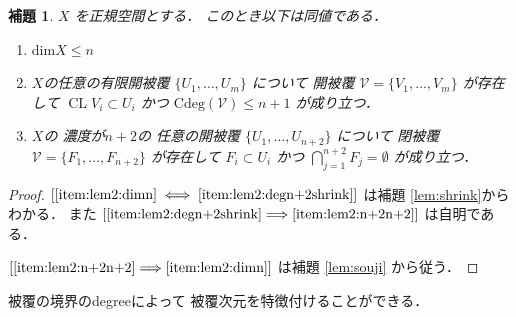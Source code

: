 \documentclass[leqno, a4paper, 12pt]{jsarticle}
\newtheorem{lem}[thm]{補題}
\newcommand{\To}{\Longrightarrow}
\DeclareMathOperator{\cl}{CL}
\newcommand{\yodim}{\mathrm{dim}}
\newcommand{\yodeg}{\mathrm{Cdeg}}
\numberwithin{equation}{section}
\begin{document}
\begin{lem}\label{lem:hihukudim2}
$X$
を正規空間とする．
このとき以下は同値である．
\begin{enumerate}[label=\textup{(\arabic*)}]
\item\label{item:lem2:dimn} 
$\yodim X\le n$
\item\label{item:lem2:degn+2shrink} 

$X$の任意の有限開被覆
$\{U_{1}, \dots, U_{m}\}$
について
開被覆
$\mathcal{V}=\{V_{1}, \dots, V_{m}\}$
が存在して
$\cl V_{i}\subset U_{i}$
かつ
$\yodeg(\mathcal{V})\le n+1$
が成り立つ．


\item\label{item:lem2:n+2n+2} 
$X$の
濃度が$n+2$の
任意の開被覆
$\{U_{1}, \dots, U_{n+2}\}$
について
閉被覆
$\mathcal{V}=\{F_{1}, \dots, F_{n+2}\}$
が存在して
$F_{i}\subset U_{i}$
かつ
$\bigcap_{j=1}^{n+2}F_{j}=\emptyset$
が成り立つ．
\end{enumerate}
\end{lem}
\begin{proof}

$[\ref{item:lem2:dimn}\iff \ref{item:lem2:degn+2shrink}]$
は補題
\ref{lem:shrink}からわかる．
また
$[\ref{item:lem2:degn+2shrink}\To\ref{item:lem2:n+2n+2}]$
は自明である．

$[\ref{item:lem2:n+2n+2}\To \ref{item:lem2:dimn}]$
は補題
\ref{lem:souji}
から従う．
\end{proof}


被覆の境界のdegreeによって
被覆次元を特徴付けることができる．
\end{document}
